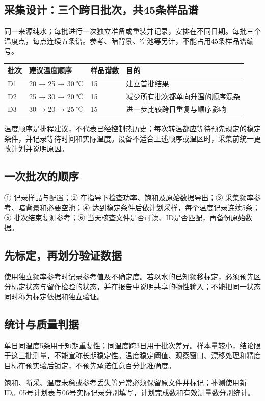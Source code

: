 \documentclass[UTF8,a4paper,11pt,fontset=fandol]{ctexart}
\begin{document}
\subsection*{采集设计：三个跨日批次，共45条样品谱}
同一来源纯水；每批进行一次独立准备或重装并记录，安排在不同日期。每批三个温度点，每点连续五条谱。参考、暗背景、空池等另计，不能占用45条样品谱编号。

\begin{longtable}{P{1.3cm}P{5.0cm}P{2.0cm}P{5.3cm}}
\toprule
\textbf{批次} & \textbf{建议温度顺序} & \textbf{样品谱数} & \textbf{目的}\\\midrule\endhead
D1 & 20 → 25 → 30 ℃ & 15 & 建立首批结果\\[0.35em]
D2 & 25 → 30 → 20 ℃ & 15 & 减少所有批次都单向升温的顺序混杂\\[0.35em]
D3 & 30 → 20 → 25 ℃ & 15 & 进一步比较跨日重复与顺序影响\\[0.35em]
\bottomrule\end{longtable}
温度顺序是排程建议，不代表已经控制热历史；每次转温都应等待预先规定的稳定条件，并记录等待时间和实际温度。设备不适合上述顺序或温区时，采集前统一更改计划并说明原因。

\subsection*{一次批次的顺序}
① 记录样品与配置；② 在指导下检查功率、饱和及原始数据导出；③ 采集频率参考、暗背景和必要空池；④ 达到稳定条件后依计划采样，每个温度记录连续5条；⑤ 批次结束复测参考；⑥ 当天核查文件是否可读、ID是否匹配，再备份原始数据。

\subsection*{先标定，再划分验证数据}
使用独立频率参考时记录参考值及不确定度。若以水的已知频移标定，必须预先区分标定状态与留作检验的状态，并在报告中说明共享的物性输入；不能把同一状态同时称为标定依据和独立验证。

\subsection*{统计与质量判据}
单日同温度5条用于短期重复性；同温度跨3日用于批次差异。样本量较小，结论限于这三批测量，不能宣称长期稳定性。温度稳定阈值、观察窗口、漂移处理和精度目标在预实验后锁定，不预先承诺任意百分比准确度。

饱和、断采、温度未稳或参考丢失等异常必须保留原文件并标记；补测使用新ID。05号计划表与06号实际记录分别填写，计划完成数和有效测量数分别统计。
\end{document}
